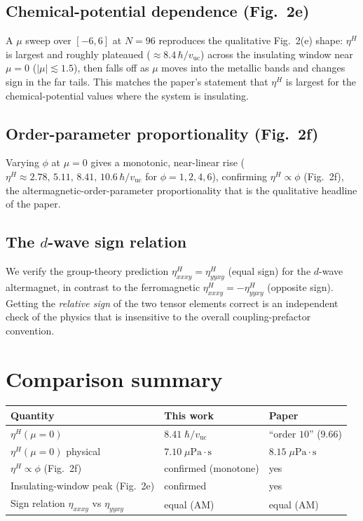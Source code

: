 \documentclass[11pt,a4paper]{article}
\newcommand{\vuc}{v_{\mathrm{uc}}}
\newcommand{\etaH}{\eta^{H}}
\begin{document}
\subsection{Chemical-potential dependence (Fig.~2e)}
A $\mu$ sweep over $[-6,6]$ at $N=96$ reproduces the qualitative Fig.~2(e) shape:
$\etaH$ is largest and roughly plateaued ($\approx 8.4\,\hbar/\vuc$) across the
insulating window near $\mu=0$ ($|\mu|\lesssim1.5$), then falls off as $\mu$ moves
into the metallic bands and changes sign in the far tails. This matches the paper's
statement that $\etaH$ is largest for the chemical-potential values where the
system is insulating.

\subsection{Order-parameter proportionality (Fig.~2f)}
Varying $\phi$ at $\mu=0$ gives a monotonic, near-linear rise
($\etaH \approx 2.78,\,5.11,\,8.41,\,10.6\,\hbar/\vuc$ for $\phi=1,2,4,6$),
confirming $\etaH \propto \phi$ (Fig.~2f), the altermagnetic-order-parameter
proportionality that is the qualitative headline of the paper.

\subsection{The $d$-wave sign relation}
We verify the group-theory prediction $\eta^{H}_{xxxy}=\eta^{H}_{yyxy}$
(equal sign) for the $d$-wave altermagnet, in contrast to the ferromagnetic
$\eta^{H}_{xxxy}=-\eta^{H}_{yyxy}$ (opposite sign). Getting the \emph{relative sign}
of the two tensor elements correct is an independent check of the physics that is
insensitive to the overall coupling-prefactor convention.

\section{Comparison summary}
\begin{center}
\begin{tabular}{lll}
\toprule
Quantity & This work & Paper \\
\midrule
$\etaH(\mu=0)$ & $8.41\;\hbar/\vuc$ & ``order $10$'' ($9.66$) \\
$\etaH(\mu=0)$ physical & $7.10\;\mu\text{Pa}\cdot\text{s}$ & $8.15\;\mu\text{Pa}\cdot\text{s}$ \\
$\etaH \propto \phi$ (Fig.~2f) & confirmed (monotone) & yes \\
Insulating-window peak (Fig.~2e) & confirmed & yes \\
Sign relation $\eta_{xxxy}$ vs $\eta_{yyxy}$ & equal (AM) & equal (AM) \\
\bottomrule
\end{tabular}
\end{center}
\end{document}
